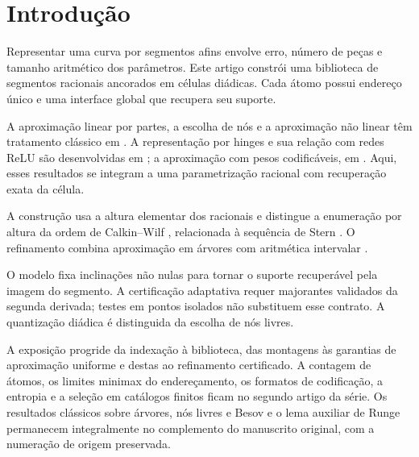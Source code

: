 \section{Introdução}
Representar uma curva por segmentos afins envolve erro, número de peças e tamanho aritmético dos parâmetros. Este artigo constrói uma biblioteca de segmentos racionais ancorados em células diádicas. Cada átomo possui endereço único e uma interface global que recupera seu suporte.

A aproximação linear por partes, a escolha de nós e a aproximação não linear têm tratamento clássico em \citet{deboor1973,burchard1974,deboor2001,powell1981,schumaker2007,devore1998}. A representação por hinges e sua relação com redes ReLU são desenvolvidas em \citet{yarotsky2017,devore2021,daubechies2022}; a aproximação com pesos codificáveis, em \citet{petersen2018,elbrachter2021,bolcskei2019,guhring2021}. Aqui, esses resultados se integram a uma parametrização racional com recuperação exata da célula.

A construção usa a altura elementar dos racionais \citep{bombieri2006} e distingue a enumeração por altura da ordem de Calkin--Wilf \citep{calkin2000}, relacionada à sequência de Stern \citep{stern1858,northshield2010}. O refinamento combina aproximação em árvores \citep{cohen2001,binev2004,kessebohmer2025} com aritmética intervalar \citep{moore2009,silva2025}.

O modelo fixa inclinações não nulas para tornar o suporte recuperável pela imagem do segmento. A certificação adaptativa requer majorantes validados da segunda derivada; testes em pontos isolados não substituem esse contrato. A quantização diádica é distinguida da escolha de nós livres.

A exposição progride da indexação à biblioteca, das montagens às garantias de aproximação uniforme e destas ao refinamento certificado. A contagem de átomos, os limites minimax do endereçamento, os formatos de codificação, a entropia e a seleção em catálogos finitos ficam no segundo artigo da série. Os resultados clássicos sobre árvores, nós livres e Besov e o lema auxiliar de Runge permanecem integralmente no complemento do manuscrito original, com a numeração de origem preservada.
